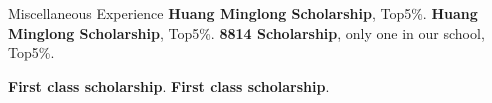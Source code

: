 \begin{rubric}{Miscellaneous Experience}
\entry*[2014-15] \textbf{Huang Minglong Scholarship}, Top5\%.
%
\entry*[2015-16] \textbf{Huang Minglong Scholarship}, Top5\%.
\entry*[2016-17] \textbf{8814 Scholarship}, only one in our school, Top5\%.

\entry*[2018] \textbf{First class scholarship}.
\entry*[2019] \textbf{First class scholarship}.
\end{rubric}
